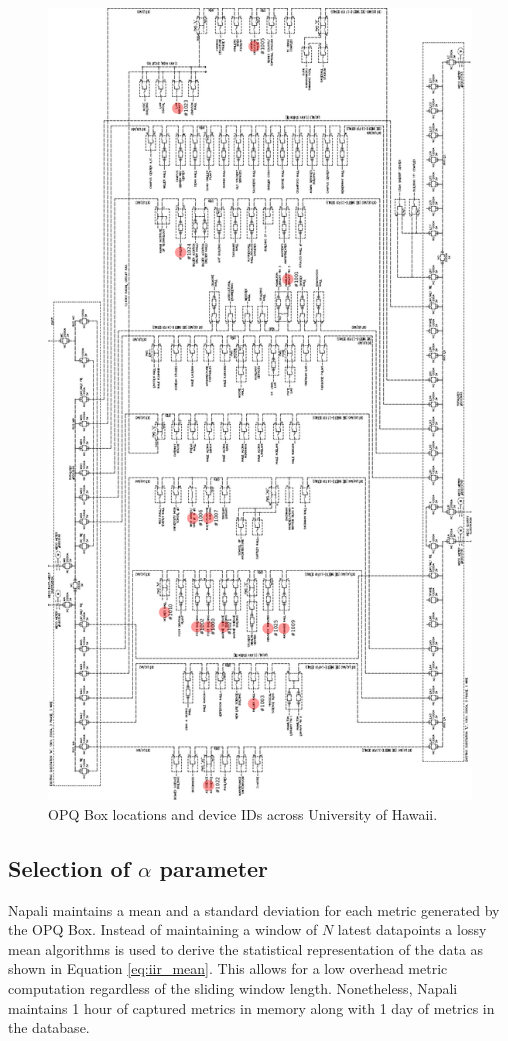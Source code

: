 \begin{figure}[H]
    \centering
    \includegraphics[width=0.7\linewidth]{img/deployment/uh_power_grid.pdf}
    \caption{OPQ Box locations and device IDs across University of Hawaii.}
    \label{expdes:fig:deploy}
\end{figure}
\clearpage
\subsection{Selection of $\alpha$ parameter}\label{subsec:selectrion-ofparameter}

Napali maintains a mean and a standard deviation for each metric generated by the OPQ Box.
Instead of maintaining a window of $N$ latest datapoints a lossy mean algorithms is used to derive the statistical representation of the data as shown in Equation \ref{eq:iir_mean}.
This allows for a low overhead metric computation regardless of the sliding window length.
Nonetheless, Napali maintains 1 hour of captured metrics in memory along with 1 day of metrics in the database.

